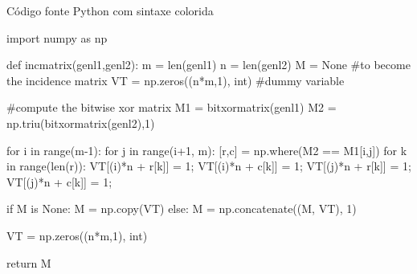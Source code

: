 \begin{listing}[H]
    \caption{Código fonte Python com sintaxe colorida}
    \label{ls:bash}
    \begin{pythoncode}
import numpy as np

def incmatrix(genl1,genl2):
    m = len(genl1)
    n = len(genl2)
    M = None #to become the incidence matrix
    VT = np.zeros((n*m,1), int)  #dummy variable

    #compute the bitwise xor matrix
    M1 = bitxormatrix(genl1)
    M2 = np.triu(bitxormatrix(genl2),1) 

    for i in range(m-1):
        for j in range(i+1, m):
            [r,c] = np.where(M2 == M1[i,j])
            for k in range(len(r)):
                VT[(i)*n + r[k]] = 1;
                VT[(i)*n + c[k]] = 1;
                VT[(j)*n + r[k]] = 1;
                VT[(j)*n + c[k]] = 1;

                if M is None:
                    M = np.copy(VT)
                else:
                    M = np.concatenate((M, VT), 1)

                VT = np.zeros((n*m,1), int)

return M
    \end{pythoncode}
\end{listing}
